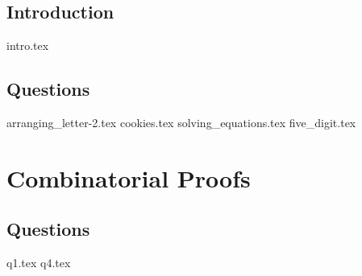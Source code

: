 \documentclass{exam}
\begin{document}
\subsection{Introduction}
{intro.tex}
\subsection{Questions}
\begin{questions}
{arranging_letter-2.tex}
{cookies.tex}
{solving_equations.tex}
{five_digit.tex}
\end{questions}

\section{Combinatorial Proofs}
\subsection{Questions}
\begin{questions}
 {q1.tex}
{q4.tex}
\end{questions}
\end{document}
